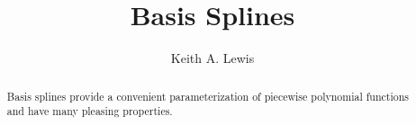 \documentclass[12pt,fleqn]{amsart}
\begin{document}
\title{Basis Splines}
\author{Keith A. Lewis}
\maketitle

\begin{abstract}
Basis splines provide a convenient parameterization of piecewise
polynomial functions and have many pleasing properties.
\end{abstract}
\end{document}
